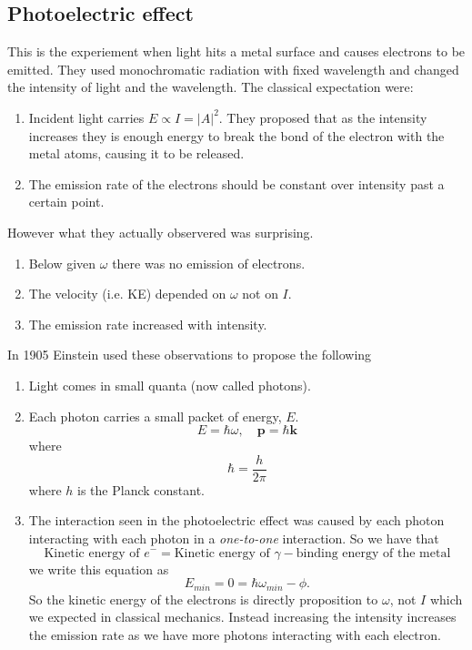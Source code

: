 \documentclass{article}
\begin{document}
\subsection{Photoelectric effect}
This is the experiement when light hits a metal surface and causes electrons to be emitted. They used monochromatic radiation with fixed wavelength and changed the intensity of light and the wavelength. The classical expectation were:
\begin{enumerate}
	\item Incident light carries $ E\propto I=|A|^2 $. They proposed that as the intensity increases they is enough energy to break the bond of the electron with the metal atoms, causing it to be released.
	\item The emission rate of the electrons should be constant over intensity past a certain point.
\end{enumerate}
However what they actually observered was surprising.
\begin{enumerate}
	\item Below given $ \omega $ there was no emission of electrons.
\item The velocity (i.e. KE) depended on $ \omega $ not on $ I $.
\item The emission rate increased with intensity.
\end{enumerate}
In 1905 Einstein used these observations to propose the following
\begin{enumerate}
	\item Light comes in small quanta (now called photons).
	\item Each photon carries a small packet of energy, $ E $.
		\[
			E=\hbar \omega,\quad \mathbf{p}=\hbar\mathbf{k}
		\]
		where
		\[
			\hbar = \frac h {2\pi}
		\]
		where $ h $ is the Planck constant.
	\item The interaction seen in the photoelectric effect was caused by each photon interacting with each photon in a \textit{one-to-one} interaction. So we have that
		\[
			\text{Kinetic energy of } e^- = \text{Kinetic energy of } \gamma - \text{binding energy of the metal}
		\]
		we write this equation as 
		\[
			E_{min}=0=\hbar\omega_{min}-\phi.
		\]
		So the kinetic energy of the electrons is directly proposition to $ \omega $, not $ I $ which we expected in classical mechanics. Instead increasing the intensity increases the emission rate as we have more photons interacting with each electron.
\end{enumerate}
\end{document}
